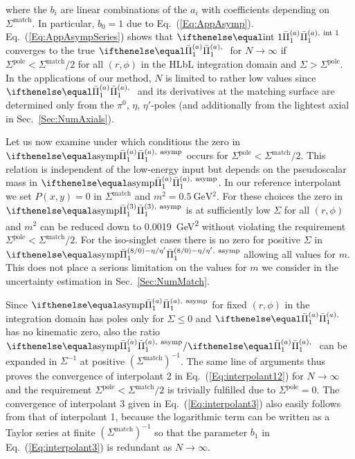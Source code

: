 where the $b_i$ are linear combinations of the $a_i$ with coefficients depending on $\Sigma^\text{match}$. In particular, $b_0 = 1$
due to Eq.~(\ref{Eq:AppAsymp}). Eq.~(\ref{Eq:AppAsympSeries}) shows that $\PiPS[\text{int 1}]$ converges to the true $\PiPS$ for $N \to \infty$ if $\Sigma^\text{pole} < \Sigma^\text{match}/2$ for all $(r,\phi)$ in the HLbL integration domain and $\Sigma > \Sigma^\text{pole}$. In the applications of our method, $N$ is limited to rather low values since $\PiPS$ and its derivatives at the matching surface are determined only from the $\pi^0$, $\eta$, $\eta'$-poles (and additionally from the lightest axial in Sec.~\ref{Sec:NumAxials}).

Let us now examine under which conditions the zero in $\PiPS[\text{asymp}]$ occurs for $\Sigma^\text{pole} < \Sigma^\text{match}/2$. This relation is independent of the low-energy input but depends on the pseudoscalar mass in $\PiPS[\text{asymp}]$. In our reference interpolant we set $P(x, y) = 0$ in $\Sigma^\text{match}$ and $m^2 = \SI{0.5}{\GeV^2}$. For these choices the zero in $\Pipion[\text{asymp}]$ is at sufficiently low $\Sigma$ for all $(r, \phi)$ and $m^2$ can be reduced down to \SI{0.0019}{\GeV^2} without violating the requirement $\Sigma^\text{pole} < \Sigma^\text{match}/2$. For the iso-singlet cases there is no zero for positive $\Sigma$ in $\Pietaetap[\text{asymp}]$ allowing all values for $m$. This does not place a serious limitation on the values for $m$ we consider in the uncertainty estimation in Sec.~\ref{Sec:NumMatch}.

Since $\PiPS[\text{asymp}]$ for fixed $(r,\phi)$ in the integration domain has poles only for $\Sigma \le 0$ and $\PiPS$ has no kinematic zero, also the ratio $\PiPS[\text{asymp}] / \PiPS$ can be expanded in $\Sigma^{-1}$ at positive $(\Sigma^\text{match})^{-1}$. The same line of arguments thus proves the convergence of interpolant 2 in Eq.~(\ref{Eq:interpolant12}) for $N\to\infty$ and the requirement $\Sigma^\text{pole} < \Sigma^\text{match}/2$ is trivially fulfilled due to $\Sigma^\text{pole} = 0$. The convergence of interpolant 3 given in Eq.~(\ref{Eq:interpolant3}) also easily follows from that of interpolant 1, because the logarithmic term can be written as a Taylor series at finite $(\Sigma^\text{match})^{-1}$ so that the parameter $b_1$ in Eq.~(\ref{Eq:interpolant3}) is redundant as $N\to\infty$. 
